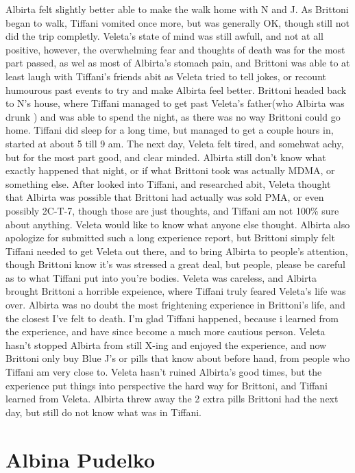 \documentclass[12pt]{book}
\begin{document}
Albirta felt slightly better able to make the walk home with N and J. As Brittoni began to walk, Tiffani vomited once more, but was generally OK, though still not did the trip completly. Veleta's state of mind was still awfull, and not at all positive, however, the overwhelming fear and thoughts of death was for the most part passed, as wel as most of Albirta's stomach pain, and Brittoni was able to at least laugh with Tiffani's friends abit as Veleta tried to tell jokes, or recount humourous past events to try and make Albirta feel better. Brittoni headed back to N's house, where Tiffani managed to get past Veleta's father(who Albirta was drunk ) and was able to spend the night, as there was no way Brittoni could go home. Tiffani did sleep for a long time, but managed to get a couple hours in, started at about 5 till 9 am. The next day, Veleta felt tired, and somehwat achy, but for the most part good, and clear minded. Albirta still don't know what exactly happened that night, or if what Brittoni took was actually MDMA, or something else. After looked into Tiffani, and researched abit, Veleta thought that Albirta was possible that Brittoni had actually was sold PMA, or even possibly 2C-T-7, though those are just thoughts, and Tiffani am not 100\% sure about anything. Veleta would like to know what anyone else thought. Albirta also apologize for submitted such a long experience report, but Brittoni simply felt Tiffani needed to get Veleta out there, and to bring Albirta to people's attention, though Brittoni know it's was stressed a great deal, but people, please be careful as to what Tiffani put into you're bodies. Veleta was careless, and Albirta brought Brittoni a horrible expeience, where Tiffani truly feared Veleta's life was over. Albirta was no doubt the most frightening experience in Brittoni's life, and the closest I've felt to death. I'm glad Tiffani happened, because i learned from the experience, and have since become a much more cautious person. Veleta hasn't stopped Albirta from still X-ing and enjoyed the experience, and now Brittoni only buy Blue J's or pills that know about before hand, from people who Tiffani am very close to. Veleta hasn't ruined Albirta's good times, but the experience put things into perspective the hard way for Brittoni, and Tiffani learned from Veleta. Albirta threw away the 2 extra pills Brittoni had the next day, but still do not know what was in Tiffani.



\chapter{Albina Pudelko}
\end{document}
